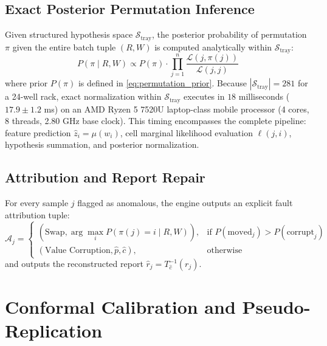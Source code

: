 \documentclass[journal,twoside]{IEEEtran}
\begin{document}
\subsection{Exact Posterior Permutation Inference}
Given structured hypothesis space $\mathcal{S}_{\text{tray}}$, the posterior probability of permutation $\pi$ given the entire batch tuple $(R, W)$ is computed analytically within $\mathcal{S}_{\text{tray}}$:
\begin{equation}
P(\pi \mid R, W) \propto P(\pi) \cdot \prod_{j=1}^n \frac{\mathcal{L}(j, \pi(j))}{\mathcal{L}(j, j)}
\label{eq:permutation_posterior}
\end{equation}
where prior $P(\pi)$ is defined in \eqref{eq:permutation_prior}. Because $|\mathcal{S}_{\text{tray}}| = 281$ for a 24-well rack, exact normalization within $\mathcal{S}_{\text{tray}}$ executes in $18$ milliseconds ($17.9 \pm 1.2$ ms) on an AMD Ryzen 5 7520U laptop-class mobile processor (4 cores, 8 threads, 2.80 GHz base clock). This timing encompasses the complete pipeline: feature prediction $\hat{z}_i = \mu(w_i)$, cell marginal likelihood evaluation $\ell(j, i)$, hypothesis summation, and posterior normalization.

\subsection{Attribution and Report Repair}
For every sample $j$ flagged as anomalous, the engine outputs an explicit fault attribution tuple:
\begin{equation}
\mathcal{A}_j = \begin{cases} 
(\text{Swap}, \arg\max_i P(\pi(j) = i \mid R, W)), & \text{if } P(\text{moved}_j) > P(\text{corrupt}_j) \\
(\text{Value Corruption}, \hat{p}, \hat{c}), & \text{otherwise}
\end{cases}
\end{equation}
and outputs the reconstructed report $\hat{r}_j = T_{\hat{c}}^{-1}(r_j)$.

\section{Conformal Calibration and Pseudo-Replication}
\end{document}
